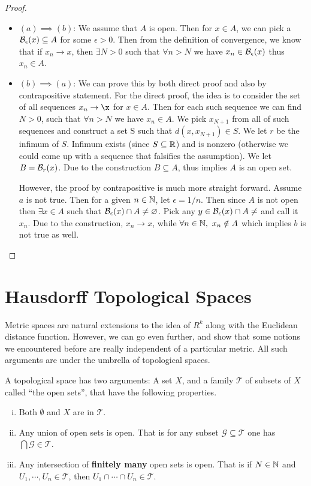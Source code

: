 \begin{proof}
	\begin{itemize}
		\item $(a) \implies (b)$: We assume that $A$ is open. Then for $x\in A$, we can pick a $\mathcal{B}_{\epsilon}(x) \subseteq A$ for some $\epsilon>0$. Then from the definition of convergence, we know that if $x_n \to x$, then $\exists N>0$ such that $\forall n>N$ we have $x_n \in \mathcal{B}_{\epsilon}(x)$ thus $x_n\in A$.
		
		\item $(b) \implies (a)$: We can prove this by both direct proof and also by contrapositive statement. For the direct proof, the idea is to consider the set of all sequences $x_n \to \x$ for $x\in A$. Then for each such sequence we can find $N>0$, such that $\forall n>N$ we have $x_n \in A$. We pick $x_{N+1}$ from all of such sequences and construct a set S such that $d(x,x_{N+1})\in S$. We let $r$ be the infimum of $S$. Infimum exists (since $S\subseteq \mathbb{R}$) and is nonzero (otherwise we could come up with a sequence that falsifies the assumption). We let $B = \mathcal{B}_{r}(x)$. Due to the construction $B \subseteq A$, thus implies $A$ is an open set. 
		
		However, the proof by contrapositive is much more straight forward. Assume $a$ is not true. Then for a given $n \in \mathbb{N}$, let $\epsilon=1/n$. Then since $A$ is not open then $\exists x\in A$ such that  $\mathcal{B}_{\epsilon}(x) \cap A \neq \varnothing$. Pick any $y \in \mathcal{B}_{\epsilon}(x) \cap A \neq$ and call it $x_n$. Due to the construction, $x_n \to x$, while $\forall n\in\mathbb{N},\ x_n\notin A$ which implies $b$ is not true as well. 
		
	\end{itemize}
\end{proof}


\section{Hausdorff Topological Spaces}
Metric spaces are natural extensions to the idea of $R^k$ along with the Euclidean distance function. However, we can go even further, and show that some notions we encountered before are really independent of a particular metric. All such arguments are under the umbrella of topological spaces. 

\begin{defbox}
	A topological space has two arguments: A set $X$, and a family $\mathcal{T}$ of subsets of $X$ called ``the open sets'', that have the following properties. 
	\begin{enumerate}[(i)]
		\item Both $\emptyset$ and $X$ are in $\mathcal{T}$.
		\item Any union of open sets is open. That is for any subset $\mathcal{G} \subseteq \mathcal{T}$ one has $\bigcap \mathcal{G} \in \mathcal{T}$.
		\item Any intersection of \textbf{finitely many} open sets is open. That is if $N\in \mathbb{N}$ and $U_1, \cdots, U_n \in \mathcal{T}$, then $U_1 \cap \cdots \cap U_n \in \mathcal{T}$.
	\end{enumerate}
\end{defbox}

